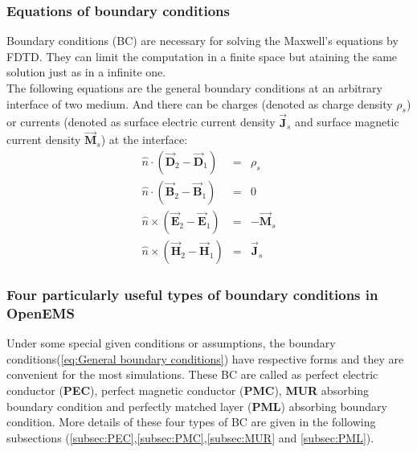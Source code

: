     \subsubsection{Equations of boundary conditions}\label{subsubsec:Equations of BC}
	  Boundary conditions (BC) are necessary for solving the  Maxwell's equations by FDTD. They can limit the computation in a finite space but ataining the same solution just as in a infinite one.  \\
	  The following equations are the general boundary conditions at an arbitrary interface of two medium. And there can be  charges (denoted as charge density $\rho_s$) or  currents (denoted as surface electric current density $\vec{\mathbf{J}}_s$ and  surface magnetic current density $\vec{\mathbf{M}}_s$) at the interface:
	      \begin{eqnarray}
		  \hat{n}\cdot(\vec{\mathbf{D}}_2-\vec{\mathbf{D}}_1) &=&\rho_s  \\
		  \hat{n}\cdot(\vec{\mathbf{B}}_2-\vec{\mathbf{B}}_1) &=&0  \\
		  \hat{n}\times(\vec{\mathbf{E}}_2-\vec{\mathbf{E}}_1) &=&-\vec{\mathbf{M}}_s \\
		  \hat{n}\times(\vec{\mathbf{H}}_2-\vec{\mathbf{H}}_1) &=&\vec{\mathbf{J}}_s
		  \label{eq:General boundary conditions}
	      \end{eqnarray}
    \subsubsection{Four particularly useful types of boundary conditions in OpenEMS}\label{subsubsec:Four particularly usefull BC}
	Under some special given conditions or assumptions, the boundary conditions(\ref{eq:General boundary conditions}) have  respective forms and they are convenient for the most simulations. These BC are called as perfect electric conductor (\textbf{PEC}), perfect magnetic conductor (\textbf{PMC}), \textbf{MUR} absorbing boundary condition and perfectly matched layer (\textbf{PML}) absorbing boundary condition. More details of these four types of BC are  given in the following subsections (\ref{subsec:PEC},\ref{subsec:PMC},\ref{subsec:MUR} and \ref{subsec:PML}).
